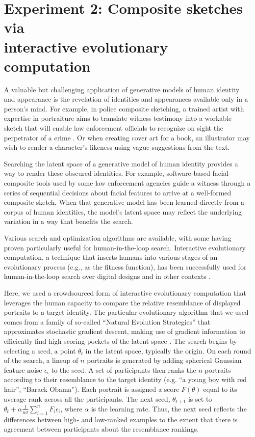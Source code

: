 \documentclass[10pt,letterpaper]{article}
\begin{document}
\section{Experiment 2: Composite sketches via\\ interactive evolutionary computation}

A valuable but challenging application of generative models of human identity and appearance is the revelation of identities and appearances available only in a person's mind. For example, in police composite sketching, a trained artist with expertise in portraiture aims to translate witness testimony into a workable sketch that will enable law enforcement officials to recognize on sight the perpetrator of a crime  \citep{mancusi2010police}. Or when creating cover art for a book, an illustrator may wish to render a character's likeness using vague suggestions from the text.

Searching the latent space of a generative model of human identity provides a way to render these obscured identities. For example, software-based facial-composite tools used by some law enforcement agencies guide a witness through a series of sequential decisions about facial features to arrive at a well-formed composite sketch. When that generative model has been learned directly from a corpus of human identities, the model's latent space may reflect the underlying variation in a way that benefits the search. 

Various search and optimization algorithms are available, with some having proven particularly useful for human-in-the-loop search. Interactive evolutionary computation, a technique that inserts humans into various stages of an evolutionary process (e.g., as the fitness function), has been successfully used for human-in-the-loop search over digital designs and in other contexts \citep{takagi2001interactive}.

Here, we used a crowdsourced form of interactive evolutionary computation that leverages the human capacity to compare the relative resemblance of displayed portraits to a target identity. The particular evolutionary algorithm that we used comes from a family of so-called ``Natural Evolution Strategies'' that approximates stochastic gradient descent, making use of gradient information to efficiently find high-scoring pockets of the latent space \citep{spall1992multivariate}. The search begins by selecting a seed, a point $\theta_t$ in the latent space, typically the origin. On each round of the search, a lineup of $n$ portraits is generated by adding spherical Gaussian feature noise $\epsilon_{i}$ to the seed. A set of participants then ranks the $n$ portraits according to their resemblance to the target identity (e.g. ``a young boy with red hair'', ``Barack Obama''). Each portrait is assigned a score $F(\theta)$ equal to its average rank across all the participants. The next seed, $\theta_{t+1}$ is set to $\theta_t + \alpha \frac{1}{n\sigma}\sum_{i=1}^{n}F_{i}\epsilon_{i}$, where $\alpha$ is the learning rate. Thus, the next seed reflects the differences between high- and low-ranked examples to the extent that there is agreement between participants about the resemblance rankings.
\end{document}
